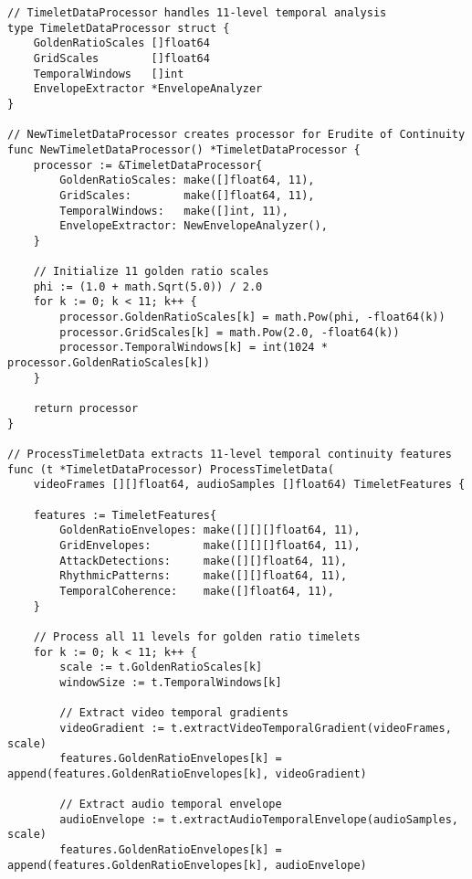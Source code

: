 \begin{tcolorbox}[colback=CodeBackground, colframe=DarkGray, title=Parallel Feature Extraction, fonttitle=\bfseries]
\begin{verbatim}
// TimeletDataProcessor handles 11-level temporal analysis
type TimeletDataProcessor struct {
    GoldenRatioScales []float64
    GridScales        []float64
    TemporalWindows   []int
    EnvelopeExtractor *EnvelopeAnalyzer
}

// NewTimeletDataProcessor creates processor for Erudite of Continuity
func NewTimeletDataProcessor() *TimeletDataProcessor {
    processor := &TimeletDataProcessor{
        GoldenRatioScales: make([]float64, 11),
        GridScales:        make([]float64, 11),
        TemporalWindows:   make([]int, 11),
        EnvelopeExtractor: NewEnvelopeAnalyzer(),
    }
    
    // Initialize 11 golden ratio scales
    phi := (1.0 + math.Sqrt(5.0)) / 2.0
    for k := 0; k < 11; k++ {
        processor.GoldenRatioScales[k] = math.Pow(phi, -float64(k))
        processor.GridScales[k] = math.Pow(2.0, -float64(k))
        processor.TemporalWindows[k] = int(1024 * processor.GoldenRatioScales[k])
    }
    
    return processor
}

// ProcessTimeletData extracts 11-level temporal continuity features
func (t *TimeletDataProcessor) ProcessTimeletData(
    videoFrames [][]float64, audioSamples []float64) TimeletFeatures {
    
    features := TimeletFeatures{
        GoldenRatioEnvelopes: make([][][]float64, 11),
        GridEnvelopes:        make([][][]float64, 11),
        AttackDetections:     make([][]float64, 11),
        RhythmicPatterns:     make([][]float64, 11),
        TemporalCoherence:    make([]float64, 11),
    }
    
    // Process all 11 levels for golden ratio timelets
    for k := 0; k < 11; k++ {
        scale := t.GoldenRatioScales[k]
        windowSize := t.TemporalWindows[k]
        
        // Extract video temporal gradients
        videoGradient := t.extractVideoTemporalGradient(videoFrames, scale)
        features.GoldenRatioEnvelopes[k] = append(features.GoldenRatioEnvelopes[k], videoGradient)
        
        // Extract audio temporal envelope
        audioEnvelope := t.extractAudioTemporalEnvelope(audioSamples, scale)
        features.GoldenRatioEnvelopes[k] = append(features.GoldenRatioEnvelopes[k], audioEnvelope)
        

\end{verbatim}
\end{tcolorbox}
